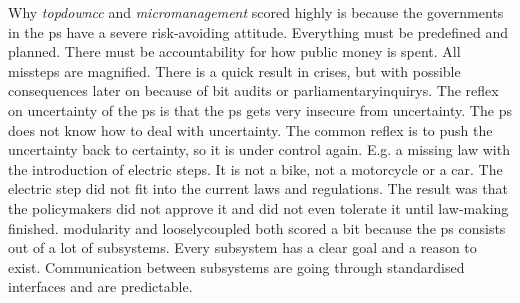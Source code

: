 Why \textit{\gls{topdowncc}} and \textit{\gls{micromanagement}} scored highly is because the governments in the \gls{ps} have a severe risk-avoiding attitude. Everything must be predefined and planned. There must be accountability for how public money is spent. All missteps are magnified. There is a quick result in crises, but with possible consequences later on because of \acrfull{bit} audits or \glspl{parliamentaryinquiry}. The reflex on \gls{uncertainty} of the \gls{ps} is that the \gls{ps} gets very insecure from \gls{uncertainty}. The \gls{ps} does not know how to deal with \gls{uncertainty}. The common reflex is to push the \gls{uncertainty} back to certainty, so it is under control again. E.g. a missing law with the introduction of electric steps. It is not a bike, not a motorcycle or a car. The electric step did not fit into the current laws and regulations. The result was that the policymakers did not approve it and did not even tolerate it until law-making finished. \Gls{modularity} and \gls{looselycoupled} both scored a bit because the \gls{ps} consists out of a lot of subsystems. Every subsystem has a clear goal and a reason to exist. Communication between subsystems are going through standardised interfaces and are predictable.
